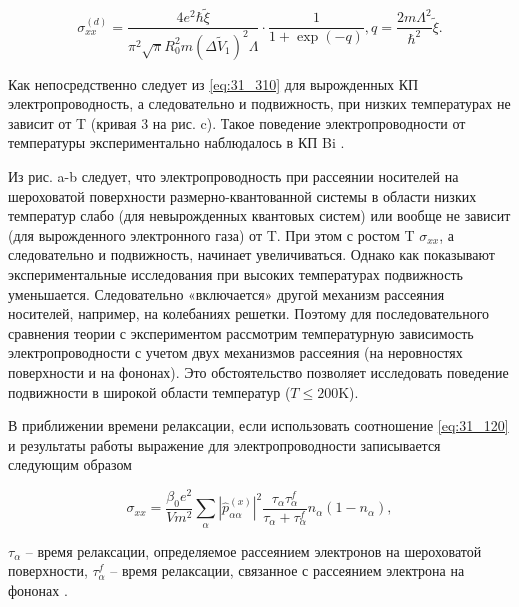 \begin{equation} \label{eq:31_310}
\sigma _{xx}^{(d)} =\frac{4e^{2} \hbar \tilde{\xi }}{\pi ^{2} \sqrt{\pi } R_{0}^{2} m\left(\Delta \tilde{V}_{1} \right)^{2} \Lambda } \cdot \frac{{\mathrm 1}}{1+{\exp}(-q)} , q=\frac{2m\Lambda ^{2} }{\hbar ^{2} } \tilde{\xi }.  
\end{equation}

Как непосредственно следует из \eqref{eq:31_310} для вырожденных КП электропроводность, а следовательно и подвижность, при низких температурах не зависит от T (кривая 3 на рис. c). Такое поведение электропроводности от температуры экспериментально наблюдалось в КП Bi \cite{Lin2000,Heremans1998,Zhang2000,Heremans2000,Gitsu2003,Nikolaeva2006,Gitsu2005}.

Из рис. a-b следует, что электропроводность при рассеянии носителей на шероховатой поверхности размерно-квантованной системы в области низких температур слабо (для невырожденных квантовых систем) или вообще не зависит (для вырожденного электронного газа) от T. При этом с ростом T $\sigma _{xx} $, а следовательно и подвижность, начинает увеличиваться. Однако как показывают экспериментальные исследования \cite{Zhang2000,Gitsu2003,Nikolaeva2006} при высоких температурах подвижность уменьшается. Следовательно «включается» другой механизм рассеяния носителей, например, на колебаниях решетки. Поэтому для последовательного сравнения теории с экспериментом рассмотрим температурную зависимость электропроводности с учетом двух механизмов рассеяния (на неровностях поверхности и на фононах). Это обстоятельство позволяет исследовать поведение подвижности в широкой области температур ($T\le 200\text{K}$).

В приближении времени релаксации, если использовать соотношение \eqref{eq:31_120} и результаты работы \cite{Khamidullin2002} выражение для электропроводности записывается следующим образом

\begin{equation} \label{eq:31_320}
\sigma _{xx} =\frac{\beta _{0} e^{2} }{Vm^{2} } \sum _{\alpha }\left|\hat{p}_{\alpha \alpha _{} }^{(x)} \right|^{2} \frac{\tau _{\alpha } \tau _{\alpha }^{f} }{\tau _{\alpha } +\tau _{\alpha }^{f} } n_{\alpha } \left(1-n_{\alpha } \right),
\end{equation}

\noindent $\tau _{\alpha } $ -- время релаксации, определяемое рассеянием электронов на шероховатой поверхности, $\tau _{\alpha }^{f} $ -- время релаксации, связанное с рассеянием электрона на фононах \cite{Khamidullin2002}.

